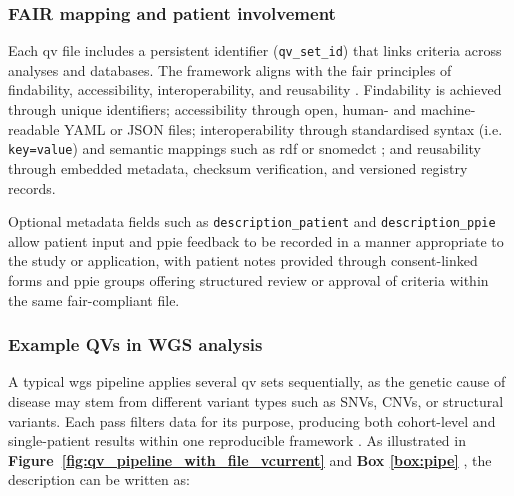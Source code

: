 \documentclass[unnumsec,webpdf,contemporary,large,namedate]{oup-authoring-template}
\newcounter{myboxcounter}
\begin{document}

\subsubsection*{FAIR mapping and patient involvement}
Each \ac{qv} file includes a persistent identifier (\texttt{qv\_set\_id}) that links criteria across analyses and databases. The framework aligns with the \ac{fair} principles of findability, accessibility, interoperability, and reusability \citep{wilkinson2016fair}. Findability is achieved through unique identifiers; accessibility through open, human- and machine-readable YAML or JSON files; interoperability through standardised syntax (i.e. \texttt{key=value}) and semantic mappings such as \ac{rdf} or \ac{snomedct} \citep{toure2023fairification, van2023bridging}; and reusability through embedded metadata, checksum verification, and versioned registry records.

Optional metadata fields such as \texttt{description\_patient} and \texttt{description\_ppie} allow patient input and \ac{ppie} feedback to be recorded in a manner appropriate to the study or application, with patient notes provided through consent-linked forms and  \ac{ppie} groups offering structured review or approval of criteria within the same \ac{fair}-compliant file.

\subsubsection{Example QVs in WGS analysis}
A typical \ac{wgs} pipeline applies several \ac{qv} sets sequentially, as the genetic cause of disease may stem from different variant types such as SNVs, CNVs, or structural variants.  
Each pass filters data for its purpose, producing both cohort-level and single-patient results within one reproducible framework \citep{auwera_genomics_2020, li2025statistical}.  
As illustrated in
 \textbf{Figure~\ref{fig:qv_pipeline_with_file_vcurrent}}
 and \textbf{Box \ref{box:pipe}} , the description can be written as:
\end{document}
